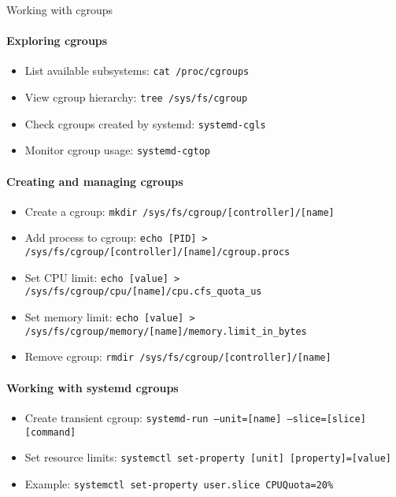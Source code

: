 \begin{KR}{Working with cgroups}
    \paragraph{Exploring cgroups}
    \begin{itemize}
        \item List available subsystems: \texttt{cat /proc/cgroups}
        \item View cgroup hierarchy: \texttt{tree /sys/fs/cgroup}
        \item Check cgroups created by systemd: \texttt{systemd-cgls}
        \item Monitor cgroup usage: \texttt{systemd-cgtop}
    \end{itemize}
    
    \paragraph{Creating and managing cgroups}
    \begin{itemize}
        \item Create a cgroup: \texttt{mkdir /sys/fs/cgroup/[controller]/[name]}
        \item Add process to cgroup: \texttt{echo [PID] > /sys/fs/cgroup/[controller]/[name]/cgroup.procs}
        \item Set CPU limit: \texttt{echo [value] > /sys/fs/cgroup/cpu/[name]/cpu.cfs\_quota\_us}
        \item Set memory limit: \texttt{echo [value] > /sys/fs/cgroup/memory/[name]/memory.limit\_in\_bytes}
        \item Remove cgroup: \texttt{rmdir /sys/fs/cgroup/[controller]/[name]}
    \end{itemize}
    
    \paragraph{Working with systemd cgroups}
    \begin{itemize}
        \item Create transient cgroup: \texttt{systemd-run --unit=[name] --slice=[slice] [command]}
        \item Set resource limits: \texttt{systemctl set-property [unit] [property]=[value]}
        \item Example: \texttt{systemctl set-property user.slice CPUQuota=20\%}
    \end{itemize}
\end{KR}

